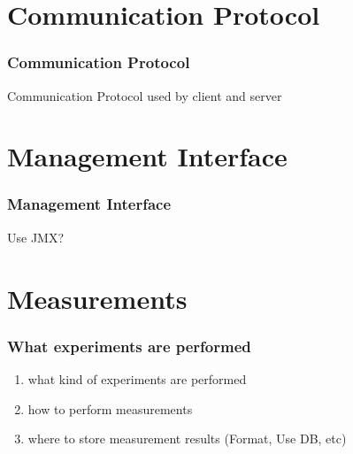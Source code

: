 \documentclass{beamer}
\begin{document}
\section{Communication Protocol}
\begin{frame}
\frametitle{Communication Protocol}
Communication Protocol used by client and server
\end{frame}



\section{Management Interface}
\begin{frame}
\frametitle{Management Interface}
Use JMX?
\end{frame}


\section{Measurements}
\begin{frame}
\frametitle{What experiments are performed}


\begin{enumerate}
\item what kind of experiments are performed
\item how to perform measurements
\item where to store measurement results (Format, Use DB, etc)
\end{enumerate}

\end{frame}
\end{document}
